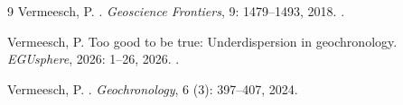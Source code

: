 \documentclass{article}
\begin{document}
\begin{thebibliography}{9}
Vermeesch, P.
.
\newblock \emph{Geoscience Frontiers}, 9: 1479--1493, 2018.
\newblock {}.

Vermeesch, P.
\newblock Too good to be true: Underdispersion in geochronology.
\newblock \emph{EGUsphere}, 2026: 1--26, 2026.
\newblock {}.

Vermeesch, P.
.
\newblock \emph{Geochronology}, 6 (3): 397--407, 2024.

\end{thebibliography}

%
%
\end{document}
